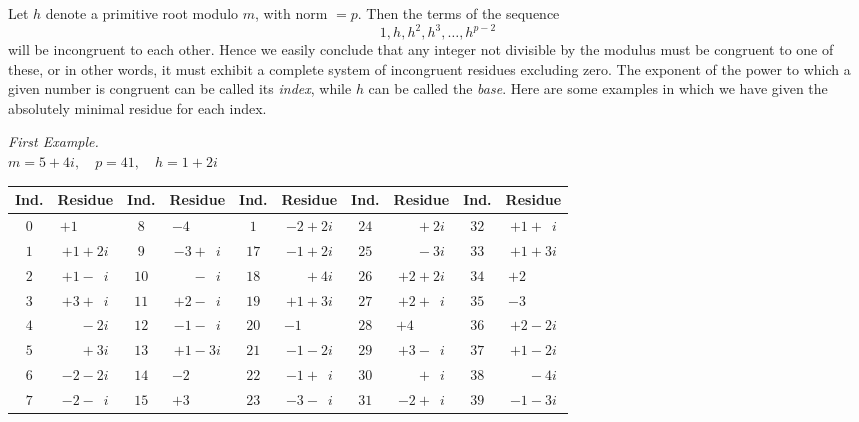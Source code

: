 \documentclass[twoside,12pt]{memoir}
\begin{document}
Let \(h\) denote a primitive root modulo \(m\), with norm \(=p\).  Then the terms of the sequence
\[1, h, h^{2}, h^{3}, \ldots, h^{p-2}\]
will be incongruent to each other. Hence we easily conclude that any integer not divisible by the modulus must be congruent to one of these, or in other words, it must exhibit a complete system of incongruent residues excluding zero. The exponent of the power to which a given number is congruent can be called its \textit{index}, while \(h\) can be called the \textit{base}. Here are some examples in which we have given the absolutely minimal residue for each index.
\begin{center}
\textit{First Example.}\\
\(m=5+4 i, \quad p=41, \quad h=1+2 i\)\\
\begin{tabular}{c|c||c|c||c|c||c|c||c|c}
Ind. & Residue & Ind. &Residue & Ind. & Residue & Ind. & Residue & Ind. & Residue \\
\hline
\(0\) & \(+1\phantom{\;+0i}\) & \(8\) & \(-4\phantom{\;+0i}\) & \(1 \)& \(-2+2 i\) & \(24\) & \(\phantom{+0}+2 i\) & \(32 \)& \(+1+\phantom{1}i\) \\
\(1\) & \(+1+2 i\) & \(9\) & \(-3+\phantom{1}i\) & \(17\) & \(-1+2 i\) & \(25\) & \(\phantom{+0}-3 i\) & \(33\) & \(+1+3 i\) \\
\(2\) & \(+1-\phantom{1}i\) & \(10\) & \(\phantom{+0}-\phantom{1}i\) & \(18\) & \(\phantom{+0}+4 i\) & \(26\) & \(+2+2 i\) & \(34\) & \(+2\phantom{\;+0i}\) \\
\(3\) & \(+3+\phantom{1}i\) & \(11\) & \(+2-\phantom{1}i\) & \(19\) & \(+1+3 i\) & \(27\) & \(+2+\phantom{1}i\) & \(35\) & \(-3\phantom{\;+0i}\)\\
\(4\) & \(\phantom{+0}-2 i\) & \(12\) & \(-1-\phantom{1}i\) & \(20\) & \(-1\phantom{\;+0i}\) & \(28\) & \(+4\phantom{\;+0i}\) & \(36\) & \(+2-2 i\) \\
\(5\) & \(\phantom{+0}+3 i\) & \(13\) & \(+1-3 i\) & \(21\) & \(-1-2 i\) & \(29\) & \(+3-\phantom{1}i\) & \(37\) & \(+1-2 i\) \\
\(6\) & \(-2-2 i\) & \(14\) & \(-2\phantom{\;+0i}\) & \(22\) & \(-1+\phantom{1}i\) & \(30\) & \(\phantom{+0}+\phantom{1}i\) & \(38\) & \(\phantom{+0}-4 i\) \\
\(7\) & \(-2-\phantom{1}i\) & \(15\) & \(+3\phantom{\;+0i}\) & \(23\) & \(-3-\phantom{1}i\) & \(31\) & \(-2+\phantom{1}i\) & \(39\) & \(-1-3 i\) \\
\end{tabular}
\end{center}\pagebreak%
\end{document}
